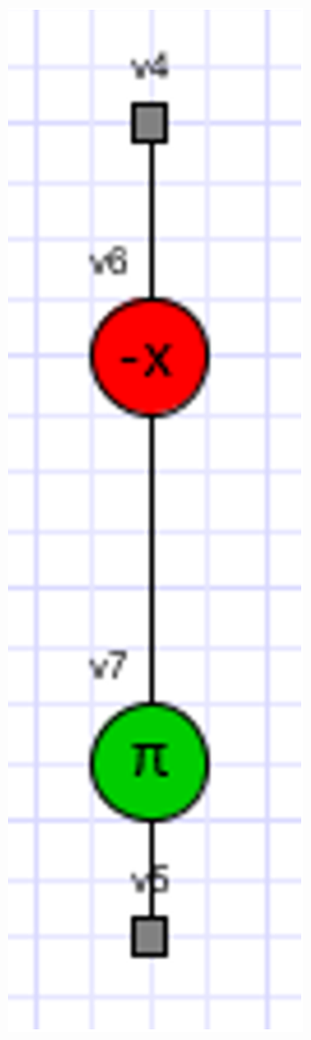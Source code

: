 \documentclass[a4paper,oneside]{book}
\begin{document}
\begin{enumerate}
\begin{center}
\begin{minipage}[c]{0.25\textwidth}
\includegraphics[scale=0.3]{IMG/inversion2-2.eps}
\end{minipage}
\label{inversion}
\end{center}


\end{enumerate}
\end{document}
